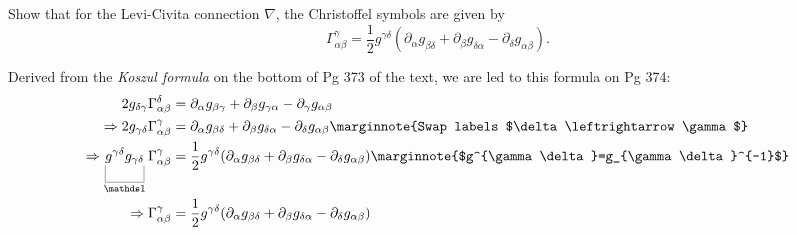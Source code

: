 \documentclass[10pt]{article}
\begin{document}
\begin{example}\label{b3e3}
	Show that for the Levi-Civita connection $\nabla$, the Christoffel symbols are given by
	$$
	\Gamma_{\alpha\beta}^\gamma = \frac12 g^{\gamma\delta}(\partial_\alpha g_{\beta\delta}+\partial_\beta g_{\delta\alpha}-\partial_\delta g_{\alpha\beta}).
	$$
\end{example}
\sol Derived from the \emph{Koszul formula} on the bottom of Pg 373 of the text, we are led to this formula on Pg 374:
$$
\begin{aligned}
	2g_{\delta\gamma}\Gamma_{\alpha\beta}^\delta &= \partial_\alpha g_{\beta\gamma}+\partial_\beta g_{\gamma\alpha}-\partial_\gamma g_{\alpha\beta}\\
	\Rightarrow 2g_{\gamma\delta}\Gamma_{\alpha\beta}^\gamma &= \partial_\alpha g_{\beta\delta}+\partial_\beta g_{\delta\alpha}-\partial_\delta g_{\alpha\beta}\marginnote{Swap labels $\delta\leftrightarrow\gamma$}\\
	\Rightarrow \ub{g^{\gamma\delta}g_{\gamma\delta}}{\id}\Gamma_{\alpha\beta}^\gamma &= \frac12 g^{\gamma\delta}(\partial_\alpha g_{\beta\delta}+\partial_\beta g_{\delta\alpha}-\partial_\delta g_{\alpha\beta})\marginnote{$g^{\gamma\delta}=g_{\gamma\delta}^{-1}$}\\
	\Rightarrow \Gamma_{\alpha\beta}^\gamma &= \frac12 g^{\gamma\delta}(\partial_\alpha g_{\beta\delta}+\partial_\beta g_{\delta\alpha}-\partial_\delta g_{\alpha\beta})
\end{aligned}
$$
\end{document}
